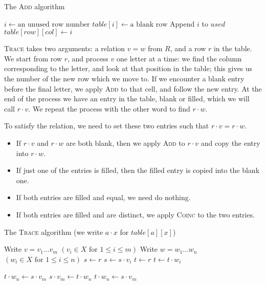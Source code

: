 \begin{algorithm}
\caption{The \textsc{Add} algorithm}\label{euclid}
\begin{algorithmic}[1]
\State $i \gets \text{an unused row number}$
\State $table[i] \gets \text{a blank row}$
\State Append $i$ to $used$
\State $table[row][col] \gets i$
\EndProcedure
\end{algorithmic}
\end{algorithm}

\textsc{Trace} takes two arguments: a relation $v=w$ from $R$, and a row $r$
in the table.  We start from row $r$, and process $v$ one letter at a time: we
find the column corresponding to the letter, and look at that position in the
table; this gives us the number of the new row which we move to.  If we
encounter a blank entry before the final letter, we apply \textsc{Add} to that
cell, and follow the new entry.  At the end of the process we have an entry in
the table, blank or filled, which we will call $r \cdot v$.  We repeat the
process with the other word to find $r \cdot w$.

To satisfy the relation, we need to set these two entries such that
$r \cdot v = r \cdot w$.
\begin{itemize}
\item If $r \cdot v$ and $r \cdot w$ are both blank, then we apply
  \textsc{Add} to $r \cdot v$ and copy the entry into $r \cdot w$.
\item If just one of the entries is filled, then the filled entry is copied into
  the blank one.
\item If both entries are filled and equal, we need do nothing.
\item If both entries are filled and are distinct, we apply \textsc{Coinc} to
  the two entries.
\end{itemize}

\begin{algorithm}
\caption{The \textsc{Trace} algorithm (we write $a \cdot x$ for $table[a][x]$)}
\begin{algorithmic}[1]
\State Write $v = v_1 \dots v_m$ \Comment $(v_i \in X \text{~for~} 1 \leq i \leq m)$
\State Write $w = w_1 \dots w_n$ \Comment $(w_i \in X \text{~for~} 1 \leq i \leq n)$
\State $s \gets r$
    \State {}
  \EndIf
  \State $s \gets s \cdot v_i$
\EndFor
\State $t \gets r$
    \State {}
  \EndIf
  \State $t \gets t \cdot w_i$
\EndFor

  \State {}
  \State $t \cdot w_n \gets s \cdot v_m$
  \State $s \cdot v_m \gets t \cdot w_n$
  \State $t \cdot w_n \gets s \cdot v_m$
  \State {}
\EndIf

\EndProcedure
\end{algorithmic}
\end{algorithm}

